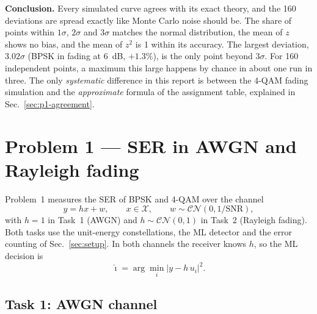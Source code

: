 \documentclass[11pt,a4paper]{article}
\newcommand{\snr}{\mathrm{SNR}}
\newcommand{\CN}{\mathcal{CN}}
\newcommand{\abs}[1]{\lvert #1 \rvert}
\begin{document}
\textbf{Conclusion.} Every simulated curve agrees with its exact theory, and the
160 deviations are spread exactly like Monte Carlo noise should be. The share of
points within $1\sigma$, $2\sigma$ and $3\sigma$ matches the normal distribution,
the mean of $z$ shows no bias, and the mean of $z^2$ is 1 within its accuracy. The
largest deviation, $3.02\sigma$ (BPSK in fading at 6~dB, $+1.3\%$), is the only
point beyond $3\sigma$. For 160 independent points, a maximum this large happens
by chance in about one run in three. The only \emph{systematic} difference in
this report is between the 4-QAM fading simulation and the \emph{approximate}
formula of the assignment table, explained in Sec.~\ref{sec:p1-agreement}.

\section{Problem 1 --- SER in AWGN and Rayleigh fading}
\label{sec:p1}

Problem~1 measures the SER of BPSK and 4-QAM over the channel
\begin{equation}
  y = hx + w, \qquad x \in \mathcal{X}, \qquad w \sim \CN(0, 1/\snr),
  \label{eq:p1-channel}
\end{equation}
with $h = 1$ in Task~1 (AWGN) and $h \sim \CN(0,1)$ in Task~2 (Rayleigh fading). Both
tasks use the unit-energy constellations, the ML detector and the error counting of
Sec.~\ref{sec:setup}. In both channels the receiver knows $h$, so the ML decision is
\begin{equation}
  \hat\imath = \arg\min_{i} \abs{y - h\,u_i}^2 .
  \label{eq:p1-ml}
\end{equation}

\subsection{Task 1: AWGN channel}
\label{sec:p1-task1}
\end{document}

